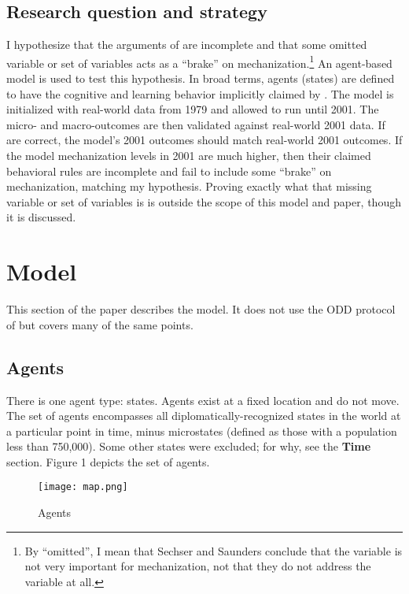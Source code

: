 \documentclass{article}
\begin{document}
\subsection{Research question and strategy}

I hypothesize that the arguments of \citet{sechser2010army} are incomplete and
that some omitted variable or set of variables acts as a ``brake'' on 
mechanization.\footnote{By ``omitted'', I mean that Sechser and Saunders conclude that the variable
is not very important for mechanization, not that they do not address the
variable at all.} An agent-based model is used to test this hypothesis. In broad
terms, agents (states) are defined to have the cognitive and learning behavior
implicitly claimed by \citet{sechser2010army}. The model is initialized with
real-world data from 1979 and allowed to run until 2001. The micro- and
macro-outcomes are then validated against real-world 2001 data. If
\citet{sechser2010army} are correct, the model's 2001 outcomes should match
real-world 2001 outcomes. If the model mechanization levels in 2001 are much
higher, then their claimed behavioral rules are incomplete and fail to include
some ``brake'' on mechanization, matching my hypothesis. Proving exactly what
that missing variable or set of variables is is outside the scope of this model
and paper, though it is discussed.

\section{Model}

This section of the paper describes the model. It does not use the ODD protocol
of \citet{grimm2006standard} but covers many of the same points.

\subsection{Agents}

There is one agent type: states. Agents exist at a fixed location and do not
move. The set of agents encompasses all diplomatically-recognized 
states in the world at a particular point in time, minus microstates (defined as
those with a population less than 750,000). Some other states were excluded; for
why, see the \textbf{Time}
section. Figure 1 depicts the set of agents.

\begin{figure}[h!]
	\centering
	\caption{Agents}
\texttt{[image: map.png]}
\end{figure}
\end{document}
